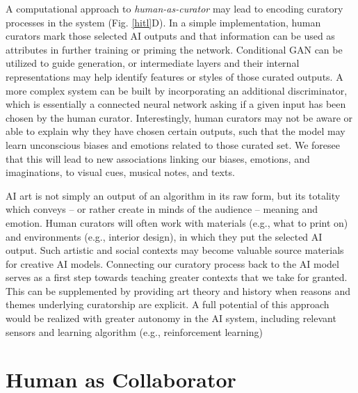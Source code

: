 \documentclass[letterpaper]{article} %
\begin{document}
A computational approach to \emph{human-as-curator} may lead to encoding curatory processes in the system (Fig. \ref{hitl}D). In a simple implementation, human curators mark those selected AI outputs and that information can be used as attributes in further training or priming the network. Conditional GAN \cite{Mirza2014} can be utilized to guide generation, or intermediate layers and their internal representations may help identify features or styles of those curated outputs. A more complex system can be built by incorporating an additional discriminator, which is essentially a connected neural network asking if a given input has been chosen by the human curator. Interestingly, human curators may not be aware or able to explain why they have chosen certain outputs, such that the model may learn unconscious biases and emotions related to those curated set. We foresee that this will lead to new associations linking our biases, emotions, and imaginations, to visual cues, musical notes, and texts.

AI art is not simply an output of an algorithm in its raw form, but its totality which conveys -- or rather create in minds of the audience -- meaning and emotion. Human curators will often work with materials (e.g., what to print on) and environments (e.g., interior design), in which they put the selected AI output. Such artistic and social contexts may become valuable source materials for creative AI models. Connecting our curatory process back to the AI model serves as a first step towards teaching greater contexts that we take for granted. This can be supplemented by providing art theory and history when reasons and themes underlying curatorship are explicit. A full potential of this approach would be realized with greater autonomy in the AI system, including relevant sensors and learning algorithm (e.g., reinforcement learning)

\section{Human as Collaborator}
\end{document}
